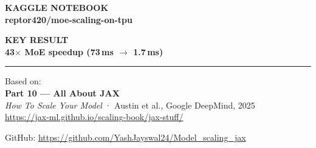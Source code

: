 \documentclass[11pt, a4paper]{article}
\begin{document}
\begin{titlepage}
\vspace{0.5cm}

\begin{minipage}[t]{0.48\linewidth}
  \begin{tcolorbox}[
    colback=white!10!covergrad, colframe=white!25!covergrad,
    arc=8pt, boxrule=0.6pt, top=8pt, bottom=8pt, left=12pt, right=12pt,
  ]
    {\footnotesize\textcolor{white!60!covergrad}{\textbf{KAGGLE NOTEBOOK}}}\\[3pt]
    {\small\textbf{reptor420/moe-scaling-on-tpu}}
  \end{tcolorbox}
\end{minipage}
\hfill
\begin{minipage}[t]{0.48\linewidth}
  \begin{tcolorbox}[
    colback=white!10!covergrad, colframe=white!25!covergrad,
    arc=8pt, boxrule=0.6pt, top=8pt, bottom=8pt, left=12pt, right=12pt,
  ]
    {\footnotesize\textcolor{white!60!covergrad}{\textbf{KEY RESULT}}}\\[3pt]
    {\small\textbf{43$\times$ MoE speedup (73\,ms $\to$ 1.7\,ms)}}
  \end{tcolorbox}
\end{minipage}

\vfill

\textcolor{white!50!covergrad}{\rule{3cm}{2pt}}

\vspace{0.5cm}

{\small\textcolor{white!70!covergrad}{Based on:}}\\
{\normalsize\textbf{Part 10 --- All About JAX}}\\
{\small\textcolor{white!80!covergrad}{\textit{How To Scale Your Model} · Austin et al., Google DeepMind, 2025}}\\
{\footnotesize\textcolor{white!60!covergrad}{\url{https://jax-ml.github.io/scaling-book/jax-stuff/}}}

\vspace{0.4cm}

{\small\textcolor{white!70!covergrad}{GitHub:} \url{https://github.com/YashJayswal24/Model_scaling_jax}}

\vspace{1cm}

\end{titlepage}

\pagecolor{white}\color{black}
\thispagestyle{empty}
\tableofcontents
\newpage

\end{document}
